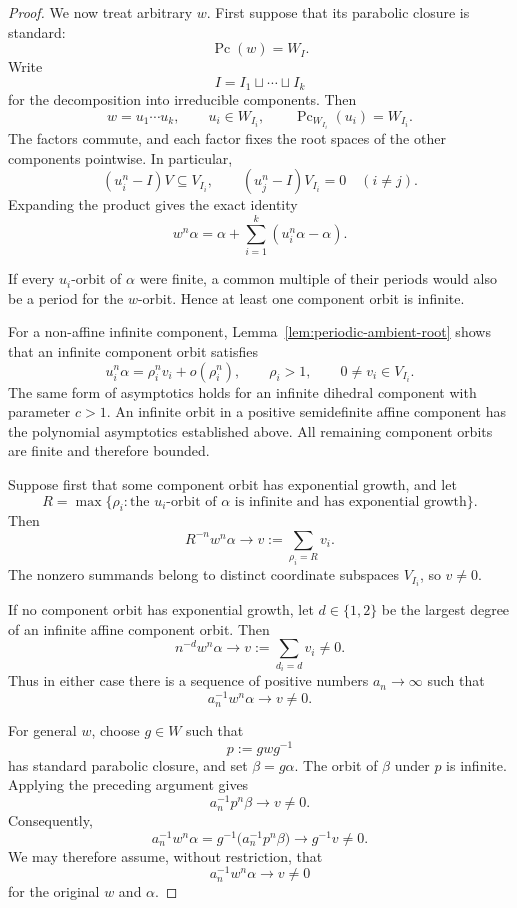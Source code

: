 \documentclass[11pt,reqno]{amsart}
\theoremstyle{plain}
\theoremstyle{definition}
\theoremstyle{remark}
\numberwithin{equation}{section}
\begin{document}
\begin{proof}
We now treat arbitrary $w$.
First suppose that its parabolic closure is standard:
\[
\operatorname{Pc}(w)=W_I.
\]
Write
\[
I=I_1\sqcup\cdots\sqcup I_k
\]
for the decomposition into irreducible components.
Then
\[
w=u_1\cdots u_k,
\qquad
u_i\in W_{I_i},
\qquad
\operatorname{Pc}_{W_{I_i}}(u_i)=W_{I_i}.
\]
The factors commute, and each factor fixes the root spaces
of the other components pointwise.
In particular,
\[
(u_i^n-I)V\subseteq V_{I_i},
\qquad
(u_j^n-I)V_{I_i}=0
\quad(i\neq j).
\]
Expanding the product gives the exact identity
\[
w^n\alpha
=
\alpha+\sum_{i=1}^k(u_i^n\alpha-\alpha).
\]

If every $u_i$-orbit of $\alpha$ were finite, a common
multiple of their periods would also be a period for the
$w$-orbit.
Hence at least one component orbit is infinite.

For a non-affine infinite component,
Lemma~\ref{lem:periodic-ambient-root} shows that an infinite
component orbit satisfies
\[
u_i^n\alpha=\rho_i^n v_i+o(\rho_i^n),
\qquad
\rho_i>1,
\qquad
0\neq v_i\in V_{I_i}.
\]
The same form of asymptotics holds for an infinite
dihedral component with parameter $c>1$.
An infinite orbit in a positive semidefinite affine
component has the polynomial asymptotics established above.
All remaining component orbits are finite and therefore
bounded.

Suppose first that some component orbit has exponential
growth, and let
\[
R=\max\{\rho_i:
        \text{the $u_i$-orbit of $\alpha$ is infinite
        and has exponential growth}\}.
\]
Then
\[
R^{-n}w^n\alpha
\longrightarrow
v:=\sum_{\rho_i=R}v_i.
\]
The nonzero summands belong to distinct coordinate subspaces
$V_{I_i}$, so $v\neq0$.

If no component orbit has exponential growth, let
$d\in\{1,2\}$ be the largest degree of an infinite affine
component orbit.
Then
\[
n^{-d}w^n\alpha
\longrightarrow
v:=\sum_{d_i=d}v_i\neq0.
\]
Thus in either case there is a sequence of positive numbers
$a_n\to\infty$ such that
\[
a_n^{-1}w^n\alpha\longrightarrow v\neq0.
\]

For general $w$, choose $g\in W$ such that
\[
p:=gwg^{-1}
\]
has standard parabolic closure, and set $\beta=g\alpha$.
The orbit of $\beta$ under $p$ is infinite.
Applying the preceding argument gives
\[
a_n^{-1}p^n\beta\longrightarrow v\neq0.
\]
Consequently,
\[
a_n^{-1}w^n\alpha
=
g^{-1}\bigl(a_n^{-1}p^n\beta\bigr)
\longrightarrow g^{-1}v\neq0.
\]
We may therefore assume, without restriction, that
\[
a_n^{-1}w^n\alpha\longrightarrow v\neq0
\]
for the original $w$ and $\alpha$.


\end{proof}
\end{document}
